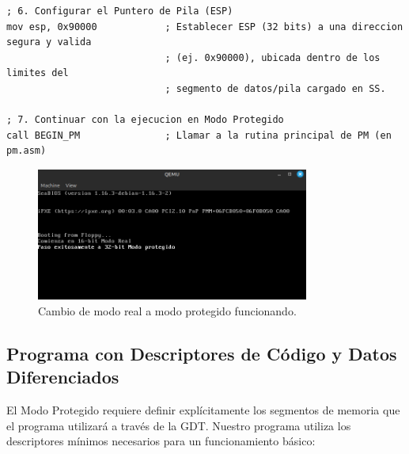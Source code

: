 \begin{lstlisting}[style=NasmStyle, breaklines=true,
    caption={\texttt{switch\_to\_pm.asm} (Nucleo de la transicion)}]
; 6. Configurar el Puntero de Pila (ESP)
mov esp, 0x90000            ; Establecer ESP (32 bits) a una direccion segura y valida
                            ; (ej. 0x90000), ubicada dentro de los limites del
                            ; segmento de datos/pila cargado en SS.

; 7. Continuar con la ejecucion en Modo Protegido
call BEGIN_PM               ; Llamar a la rutina principal de PM (en pm.asm)
\end{lstlisting}

\begin{figure}[H]
    \centering
    \includegraphics[width=0.8\textwidth]{images/switchtopm.png}
    \caption{Cambio de modo real a modo protegido funcionando.}
\end{figure}

\subsection{Programa con Descriptores de Código y Datos Diferenciados}

El Modo Protegido requiere definir explícitamente los segmentos de memoria que el programa utilizará a través de la GDT. Nuestro programa utiliza los descriptores mínimos necesarios para un funcionamiento básico:

